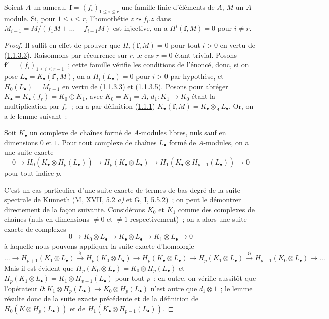 \begin{proposition}[1.1.4]
\label{III.1.1.4-fr}
Soient $A$ un anneau, $\mathbf f=(f_i)_{1\leq i\leq r}$ une famille finie
d'éléments de $A$, $M$ un $A$-module. Si, pour $1\leq i\leq r$, l'homothétie
$z\leadsto f_i.z$ dans $M_{i-1}=M/(f_1M+\ldots+f_{i-1}M)$ est injective, on a
$H^i(\mathbf f,M)=0$ pour $i\neq r$.
\end{proposition}

\begin{proof}
Il suffit en effet de prouver que $H_i(\mathbf f,M)=0$ pour tout $i>0$ en
vertu de (\hyperref[III.1.1.3.3-fr]{1.1.3.3}). Raisonnons par récurrence sur
$r$, le cas $r=0$ étant trivial. Posons
$\mathbf f'=(f_i)_{1\leq i\leq r-1}$~; cette famille vérifie les conditions de
l'énoncé, donc, si on pose $L_\bullet=K_\bullet(\mathbf f',M)$, on a
$H_i(L_\bullet)=0$ pour $i>0$ par hypothèse, et
$H_0(L_\bullet)=M_{r-1}$ en vertu de
(\hyperref[III.1.1.3.3-fr]{1.1.3.3}) et
(\hyperref[III.1.1.3.5-fr]{1.1.3.5}). Posons pour abréger
$K_\bullet=K_\bullet(f_r)=K_0\oplus K_1$, avec $K_0=K_1=A$,
$d_1:K_1\to K_0$ étant la multiplication par $f_r$~; on a par définition
(\hyperref[III.1.1.1-fr]{1.1.1})
$K_\bullet(\mathbf f,M)=K_\bullet\otimes_A L_\bullet$. Or, on a le lemme
suivant~:

\begin{lemma}[1.1.4.1]
\label{III.1.1.4.1-fr}
Soit $K_\bullet$ un complexe de chaînes formé de $A$-modules libres, nuls sauf
en dimensions $0$ et $1$. Pour tout complexe de chaînes $L_\bullet$ formé de
$A$-modules, on a une suite exacte
\[
0\longrightarrow H_0(K_\bullet\otimes H_p(L_\bullet))
\longrightarrow H_p(K_\bullet\otimes L_\bullet)
\longrightarrow H_1(K_\bullet\otimes H_{p-1}(L_\bullet))
\longrightarrow0
\]
pour tout indice $p$.
\end{lemma}

C'est un cas particulier d'une suite exacte de termes de bas degré de la
suite spectrale de Künneth (M, XVII, 5.2 \emph{a)} et G, I, 5.5.2)~; on peut le
démontrer directement de la façon suivante. Considérons $K_0$ et $K_1$ comme
des complexes de chaînes (nuls en dimensions $\neq0$ et $\neq1$
respectivement)~; on a alors une suite exacte de complexes
\[
0\longrightarrow K_0\otimes L_\bullet
\longrightarrow K_\bullet\otimes L_\bullet
\longrightarrow K_1\otimes L_\bullet\longrightarrow0
\]
à laquelle nous pouvons appliquer la suite exacte d'homologie
\[
\ldots\longrightarrow H_{p+1}(K_1\otimes L_\bullet)
\xrightarrow{\partial}H_p(K_0\otimes L_\bullet)
\longrightarrow H_p(K_\bullet\otimes L_\bullet)
\longrightarrow H_p(K_1\otimes L_\bullet)
\xrightarrow{\partial}H_{p-1}(K_0\otimes L_\bullet)
\longrightarrow\ldots
\]
Mais il est évident que
$H_p(K_0\otimes L_\bullet)=K_0\otimes H_p(L_\bullet)$ et
$H_p(K_1\otimes L_\bullet)=K_1\otimes H_{v-1}(L_\bullet)$ pour tout $p$~; en
outre, on vérifie aussitôt que l'opérateur
$\partial:K_1\otimes H_p(L_\bullet)\to K_0\otimes H_p(L_\bullet)$ n'est autre
que $d_1\otimes1$~; le lemme résulte donc de la suite exacte précédente et de
la définition de $H_0(K\otimes H_p(L_\bullet))$ et de
$H_1(K_\bullet\otimes H_{p-1}(L_\bullet))$.


\end{proof}
